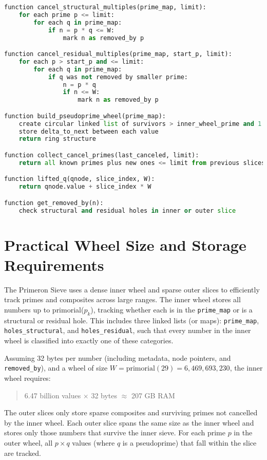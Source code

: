 \begin{lstlisting}[language=Python, basicstyle=\ttfamily\footnotesize, frame=single]
function cancel_structural_multiples(prime_map, limit):
    for each prime p <= limit:
        for each q in prime_map:
            if n = p * q <= W:
                mark n as removed_by p

function cancel_residual_multiples(prime_map, start_p, limit):
    for each p > start_p and <= limit:
        for each q in prime_map:
            if q was not removed by smaller prime:
                n = p * q
                if n <= W:
                    mark n as removed_by p

function build_pseudoprime_wheel(prime_map):
    create circular linked list of survivors > inner_wheel_prime and 1
    store delta_to_next between each value
    return ring structure

function collect_cancel_primes(last_canceled, limit):
    return all known primes plus new ones <= limit from previous slices

function lifted_q(qnode, slice_index, W):
    return qnode.value + slice_index * W

function get_removed_by(n):
    check structural and residual holes in inner or outer slice
\end{lstlisting}

\section{Practical Wheel Size and Storage Requirements}
The Primeron Sieve uses a dense inner wheel and sparse outer slices to efficiently track primes and composites across large ranges. The inner wheel stores all numbers up to primorial($p_k$), tracking whether each is in the \texttt{prime\_map} or is a structural or residual hole. This includes three linked lists (or maps): \texttt{prime\_map}, \texttt{holes\_structural}, and \texttt{holes\_residual}, such that every number in the inner wheel is classified into exactly one of these categories.

Assuming 32 bytes per number (including metadata, node pointers, and \texttt{removed\_by}), and a wheel of size $W = \text{primorial}(29) = 6,\!469,\!693,\!230$, the inner wheel requires:

\begin{quote}
6.47 billion values $\times$ 32 bytes $\approx$ 207 GB RAM
\end{quote}

The outer slices only store sparse composites and surviving primes not cancelled by the inner wheel. Each outer slice spans the same size as the inner wheel and stores only those numbers that survive the inner sieve. For each prime $p$ in the outer wheel, all $p \times q$ values (where $q$ is a pseudoprime) that fall within the slice are tracked.

